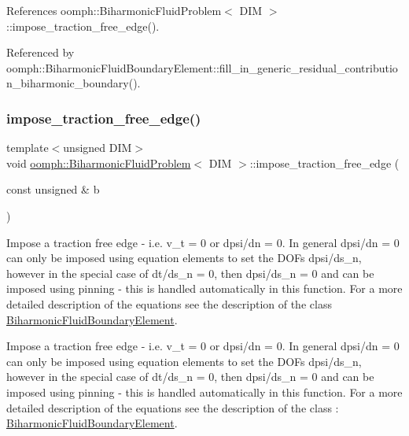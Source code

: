 References oomph\+::\+Biharmonic\+Fluid\+Problem$<$ D\+I\+M $>$\+::impose\+\_\+traction\+\_\+free\+\_\+edge().



Referenced by oomph\+::\+Biharmonic\+Fluid\+Boundary\+Element\+::fill\+\_\+in\+\_\+generic\+\_\+residual\+\_\+contribution\+\_\+biharmonic\+\_\+boundary().

\mbox{\label{classoomph_1_1BiharmonicFluidProblem_a1cc57555bbd0ceef1d93010c133ac597}} 
\subsubsection{\texorpdfstring{impose\+\_\+traction\+\_\+free\+\_\+edge()}{impose\_traction\_free\_edge()}}
{\footnotesize\ttfamily template$<$unsigned D\+IM$>$ \\
void \hyperlink{classoomph_1_1BiharmonicFluidProblem}{oomph\+::\+Biharmonic\+Fluid\+Problem}$<$ D\+IM $>$\+::impose\+\_\+traction\+\_\+free\+\_\+edge (\begin{DoxyParamCaption}\item[{const unsigned \&}]{b }\end{DoxyParamCaption})\hspace{0.3cm}{\ttfamily [protected]}}



Impose a traction free edge -\/ i.\+e. v\+\_\+t = 0 or dpsi/dn = 0. In general dpsi/dn = 0 can only be imposed using equation elements to set the D\+O\+Fs dpsi/ds\+\_\+n, however in the special case of dt/ds\+\_\+n = 0, then dpsi/ds\+\_\+n = 0 and can be imposed using pinning -\/ this is handled automatically in this function. For a more detailed description of the equations see the description of the class \hyperlink{classoomph_1_1BiharmonicFluidBoundaryElement}{Biharmonic\+Fluid\+Boundary\+Element}. 

Impose a traction free edge -\/ i.\+e. v\+\_\+t = 0 or dpsi/dn = 0. In general dpsi/dn = 0 can only be imposed using equation elements to set the D\+O\+Fs dpsi/ds\+\_\+n, however in the special case of dt/ds\+\_\+n = 0, then dpsi/ds\+\_\+n = 0 and can be imposed using pinning -\/ this is handled automatically in this function. For a more detailed description of the equations see the description of the class \+: \hyperlink{classoomph_1_1BiharmonicFluidBoundaryElement}{Biharmonic\+Fluid\+Boundary\+Element}. 

